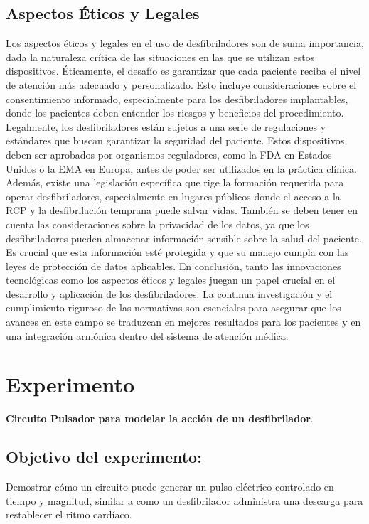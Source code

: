 \subsection{Aspectos Éticos y Legales}

Los aspectos éticos y legales en el uso de desfibriladores son de suma importancia, dada la naturaleza crítica de las situaciones en las que se utilizan estos dispositivos. Éticamente, el desafío es garantizar que cada paciente reciba el nivel de atención más adecuado y personalizado. Esto incluye consideraciones sobre el consentimiento informado, especialmente para los desfibriladores implantables, donde los pacientes deben entender los riesgos y beneficios del procedimiento.\newline \hfill \break
Legalmente, los desfibriladores están sujetos a una serie de regulaciones y estándares que buscan garantizar la seguridad del paciente. Estos dispositivos deben ser aprobados por organismos reguladores, como la FDA en Estados Unidos o la EMA en Europa, antes de poder ser utilizados en la práctica clínica. Además, existe una legislación específica que rige la formación requerida para operar desfibriladores, especialmente en lugares públicos donde el acceso a la RCP y la desfibrilación temprana puede salvar vidas.\newline \hfill \break
También se deben tener en cuenta las consideraciones sobre la privacidad de los datos, ya que los desfibriladores pueden almacenar información sensible sobre la salud del paciente. Es crucial que esta información esté protegida y que su manejo cumpla con las leyes de protección de datos aplicables.\newline \hfill \break
En conclusión, tanto las innovaciones tecnológicas como los aspectos éticos y legales juegan un papel crucial en el desarrollo y aplicación de los desfibriladores. La continua investigación y el cumplimiento riguroso de las normativas son esenciales para asegurar que los avances en este campo se traduzcan en mejores resultados para los pacientes y en una integración armónica dentro del sistema de atención médica.

\newpage
\section{Experimento}

\textbf{Circuito Pulsador para modelar la acción de un desfibrilador}.
\subsection{Objetivo del experimento:}
Demostrar cómo un circuito puede generar un pulso eléctrico controlado en tiempo y magnitud, similar a como un desfibrilador administra una descarga para restablecer el ritmo cardíaco.
